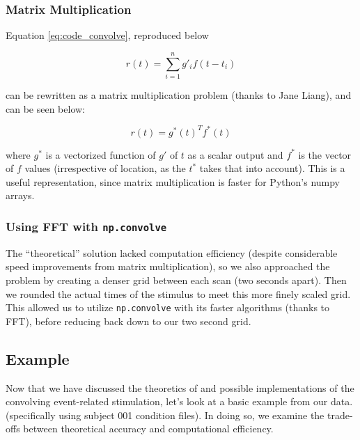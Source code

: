 \subsubsection{Matrix Multiplication}
Equation \ref{eq:code_convolve}, reproduced below

$$r(t)= \sum_{i=1}^n g'_{i} f(t-t_i)$$

can be rewritten as a matrix multiplication problem (thanks to Jane Liang), 
and can be seen below:

\begin{equation} \label{eq:matrix_code_convolve}
r(t)=  g^*(t)^T f^*(t)
\end{equation}

where $g^*$ is a vectorized function of $g'$ of $t$ as a scalar output and 
$f^*$ is the vector of $f$ values (irrespective of location, as the $t^*$ 
takes that into account). This is a useful representation, since matrix 
multiplication is faster for Python's numpy arrays. 


\subsubsection{Using FFT with \texttt{np.convolve}}
The ``theoretical'' solution lacked computation efficiency (despite 
considerable speed improvements from matrix multiplication), so we also 
approached the problem by creating a denser grid between each scan (two seconds 
apart). Then we rounded the actual times of the stimulus to meet this more 
finely scaled grid. This allowed us to utilize \texttt{np.convolve} with its 
faster algorithms (thanks to FFT), before reducing back down to our two second 
grid. 


\subsection{Example}

Now that we have discussed the theoretics of and possible implementations of 
the convolving event-related stimulation, let's look at a basic example from 
our data.(specifically using subject 001 condition files). In doing so, we 
examine the trade-offs between theoretical accuracy and computational 
efficiency.


